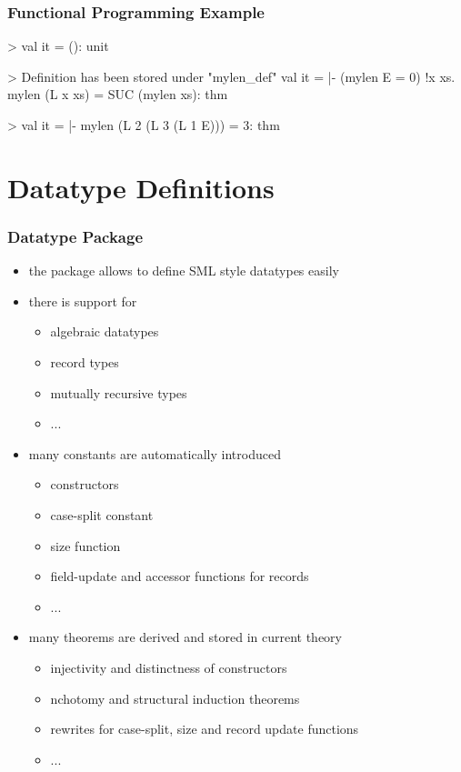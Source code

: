 \begin{frame}[fragile]
\frametitle{Functional Programming Example}

\begin{semiverbatim}\scriptsize
>  
val it = (): unit

>  
Definition has been stored under "mylen\_def"
val it =
   |- (mylen E = 0) \holAnd{} !x xs. mylen (L x xs) = SUC (mylen xs):
   thm

> 
val it =
   |- mylen (L 2 (L 3 (L 1 E))) = 3:
   thm
\end{semiverbatim}

\end{frame}


\section{Datatype Definitions}

\begin{frame}[fragile]
\frametitle{Datatype Package}
\begin{itemize}
\item the  package allows to define SML style datatypes easily
\item there is support for 
\begin{itemize}
\item algebraic datatypes
\item record types
\item mutually recursive types
\item ...
\end{itemize}
\item many constants are automatically introduced
\begin{itemize}
\item constructors
\item case-split constant
\item size function
\item field-update and accessor functions for records
\item ...
\end{itemize}
\item many theorems are derived and stored in current theory
\begin{itemize}
\item injectivity and distinctness of constructors
\item nchotomy and structural induction theorems
\item rewrites for case-split, size and record update functions
\item ...
\end{itemize}
\end{itemize}
\end{frame}

